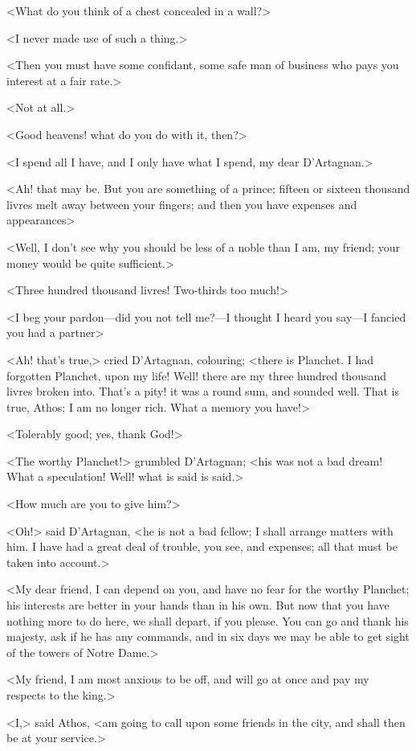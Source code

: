 <What do you think of a chest concealed in a wall?>

<I never made use of such a thing.>

<Then you must have some confidant, some safe man of business who pays you interest at a fair rate.>

<Not at all.>

<Good heavens! what do you do with it, then?>

<I spend all I have, and I only have what I spend, my dear D'Artagnan.>

<Ah! that may be. But you are something of a prince; fifteen or sixteen thousand livres melt away between your fingers; and then you have expenses and appearances\longdash>

<Well, I don't see why you should be less of a noble than I am, my friend; your money would be quite sufficient.>

<Three hundred thousand livres! Two-thirds too much!>

<I beg your pardon—did you not tell me?—I thought I heard you say—I fancied you had a partner\longdash>

<Ah!  that's true,> cried D'Artagnan, colouring; <there is Planchet. I had forgotten Planchet, upon my life! Well! there are my three hundred thousand livres broken into. That's a pity! it was a round sum, and sounded well. That is true, Athos; I am no longer rich. What a memory you have!>

<Tolerably good; yes, thank God!>

<The worthy Planchet!> grumbled D'Artagnan; <his was not a bad dream! What a speculation!  Well! what is said is said.>

<How much are you to give him?>

<Oh!> said D'Artagnan, <he is not a bad fellow; I shall arrange matters with him. I have had a great deal of trouble, you see, and expenses; all that must be taken into account.>

<My dear friend, I can depend on you, and have no fear for the worthy Planchet; his interests are better in your hands than in his own. But now that you have nothing more to do here, we shall depart, if you please. You can go and thank his majesty, ask if he has any commands, and in six days we may be able to get sight of the towers of Notre Dame.>

<My friend, I am most anxious to be off, and will go at once and pay my respects to the king.>

<I,> said Athos, <am going to call upon some friends in the city, and shall then be at your service.>

